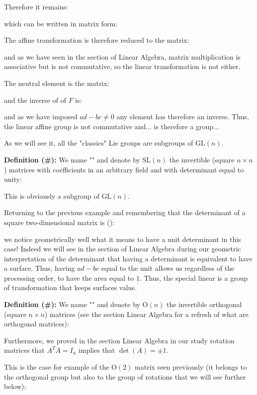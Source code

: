 	Therefore it remains:
	
	which can be written in matrix form:
	
	The affine transformation is therefore reduced to the matrix:
	
	and as we have seen in the section of Linear Algebra, matrix multiplication is associative but is not commutative, so the linear transformation is not either.
	
	The neutral element is the matrix:
	
	and the inverse of of $F$ is:
	
	and as we have imposed $ad-bc\neq 0$ any element has therefore an inverse. Thus, the linear affine group is not commutative and... is therefore a group...
	
	As we will see it, all the "classics" Lie groups are subgroups of $\text{GL} (n)$.
	
	\textbf{Definition (\#\mydef):} We name "" and denote by $\text{SL} (n)$ the invertible (square $n\times n$) matrices with coefficients in an arbitrary field and with determinant equal to unity:
	
	This is obviously a subgroup of $\text{GL} (n)$.
	
	Returning to the previous example and remembering that the determinant of a square two-dimensional  matrix is ():
	
	we notice geometrically well what it means to have a unit determinant in this case! Indeed we will see in the section of Linear Algebra during our geometric interpretation of the determinant that having a determinant is equivalent to have a surface. Thus, having $ad-bc$ equal to the unit allows us regardless of the processing order, to have the area equal to $1$. Thus, the special linear is a group of transformation that keeps surfaces value.
	
	\textbf{Definition (\#\mydef):} We name "" and denote by $\text{O} (n)$ the invertible orthogonal (square $n\times n$) matrices (see the section Linear Algebra for a refresh of what are orthogonal matrices):
	
	Furthermore, we proved in the section Linear Algebra in our study rotation matrices that $A^TA=I_n$ implies that $\det(A)=\pm 1$.
	
	This is the case for example of the $\text{O}(2)$ matrix seen previously (it belongs to the orthogonal group but also to the group of rotations that we will see further below):
	
